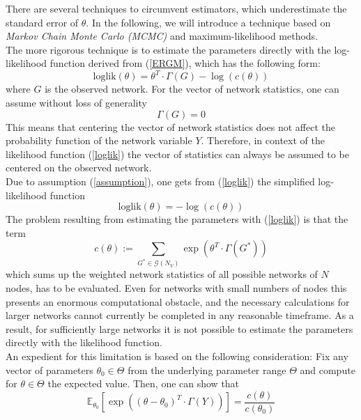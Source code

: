 \documentclass[headsepline=true, abstracton]{scrartcl}
\begin{document}
There are several techniques to circumvent estimators, which underestimate the standard error of $\theta$. In the following, we will introduce a technique based on \textit{Markov Chain Monte Carlo (MCMC)} and maximum-likelihood methods.\\[0.3cm]
The more rigorous technique is to estimate the parameters directly with the log-likelihood function derived from (\ref{ERGM}), which has the following form:
%
\begin{equation}
\text{loglik}(\theta)=\theta^T \cdot \Gamma(G)-\log(c(\theta))
\label{loglik}
\end{equation}
%
where $G$ is the observed network. For the vector of network statistics, one can assume without loss of generality
%
\begin{equation}
\Gamma(G)=0 \label{assumption}
\end{equation}
%
This means that centering the vector of network statistics does not affect the probability function of the network variable $Y$. Therefore, in context of the likelihood function (\ref{loglik}) the vector of statistics can always be assumed to be centered on the observed network.\\
Due to assumption (\ref{assumption}), one gets from (\ref{loglik}) the simplified log-likelihood function
%
\begin{equation}
\text{loglik}(\theta)= -\log(c(\theta))
\label{vloglik}
\end{equation}
%
The problem resulting from estimating the parameters with (\ref{loglik}) is that the term
%
$$c(\theta):= \sum_{G^* \in \mathcal{G}(N_V)} \exp(\theta^T \cdot \Gamma(G^*))$$ 
%
which sums up the weighted network statistics of all possible networks of $N$ nodes, has to be evaluated. Even for networks with small numbers of nodes this presents an enormous computational obstacle, and the necessary calculations for larger networks cannot currently be completed in any reasonable timeframe.
As a result, for sufficiently large networks it is not possible to estimate the parameters directly with the likelihood function.
\\[0.3cm]
An expedient for this limitation is based on the following consideration: Fix any vector of parameters $\theta_0 \in \Theta$ from the underlying parameter range $\Theta$ and compute for $\theta \in \Theta$ the expected value. Then, one can show that
%
\begin{equation*}
\mathbb{E}_{\theta_0}\left[ \exp\left((\theta - \theta_0)^T \cdot \Gamma(Y)\right) \right]=\frac{c(\theta)}{c(\theta_0)}
\end{equation*}
\end{document}
